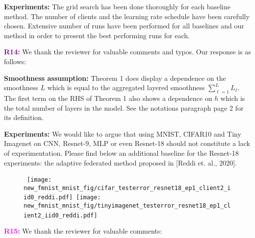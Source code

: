 \documentclass{article}
\begin{document}
\textbf{Experiments:} The grid search has been done thoroughly for each baseline method. The number of clients and the learning rate schedule have been carefully chosen. Extensive number of runs have been performed for all baselines and our method in order to present the best performing runs for each.


\vspace{0.01in}

\textbf{\textcolor{purple}{R14:}} We thank the reviewer for valuable comments and typos. Our response is as follows:\vspace{-5pt}

\textbf{Smoothness assumption:} Theorem 1 does display a dependence on the smoothness $L$ which is equal to the aggregated layered smoothness $\sum_{\ell =1}^L L_\ell$. 
The first term on the RHS of Theorem 1 also shows a dependence on $h$ which is the total number of layers in the model. See the notations paragraph page 2 for its definition.

\textbf{Experiments:} We would like to argue that using MNIST, CIFAR10 and Tiny Imagenet on CNN, Resnet-9, MLP or even Resnet-18 should not constitute a lack of experimentation. 
Please find below an additional baseline for the Resnet-18 experiments: the adaptive federated method proposed in [Reddi et. al., 2020].

\begin{figure}[H]
    \begin{center}
        \mbox{
        \hspace{-0.05in}\texttt{[image: new\_fmnist\_mnist\_fig/cifar\_testerror\_resnet18\_ep1\_client2\_iid0\_reddi.pdf]}
        \hspace{-0.1in}\texttt{[image: new\_fmnist\_mnist\_fig/tinyimagenet\_testerror\_resnet18\_ep1\_client2\_iid0\_reddi.pdf]}\hspace{-0.1in}
        }
    \end{center}
	\label{fig:noniidresnet18}
\end{figure}

\vspace{0.01in}

\textbf{\textcolor{magenta}{R15:}} We thank the reviewer for valuable comments:\vspace{-5pt}
\end{document}
